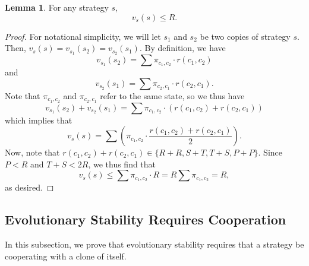 \documentclass[12pt]{article}
\theoremstyle{definition}
\newtheorem{lemma}[theorem]{Lemma}
\theoremstyle{remark}
\begin{document}
\begin{lemma}
  \label{neverbetterthanr}
  For any strategy $s$,
  \begin{equation*}
    v_{s}(s) \leq R.
  \end{equation*}
\end{lemma}
\begin{proof}
  For notational simplicity, we will let $s_1$ and $s_2$ be two copies of strategy $s$. Then, $v_{s}(s) = v_{s_1}(s_2) = v_{s_2}(s_1)$. By definition, we have
  \begin{equation*}
    v_{s_1}(s_2) = \sum \pi_{c_1,c_2} \cdot r(c_1, c_2)
  \end{equation*}
  and
  \begin{equation*}
    v_{s_2}(s_1) = \sum \pi_{c_2,c_1} \cdot r(c_2, c_1).
  \end{equation*}
  Note that $\pi_{c_1,c_2}$ and $\pi_{c_2,c_1}$ refer to the same state, so we thus have \begin{equation*}
    v_{s_1}(s_2) + v_{s_2}(s_1) = \sum \pi_{c_1,c_2} \cdot (r(c_1,c_2) + r(c_2,c_1))
  \end{equation*}
  which implies that \begin{equation*}
    v_s(s) = \sum \left( \pi_{c_1,c_2} \cdot \frac{r(c_1,c_2) + r(c_2,c_1)}{2} \right).
  \end{equation*}
  Now, note that $r(c_1,c_2) + r(c_2,c_1) \in \{R + R, S + T, T+S, P + P\}$. Since $P < R$ and $T + S < 2R$, we thus find that \begin{equation*}
    v_s(s) \leq \sum \pi_{c_1,c_2} \cdot R = R \sum \pi_{c_1,c_2} = R,
  \end{equation*}
  as desired.
\end{proof}

\subsection{Evolutionary Stability Requires Cooperation}

In this subsection, we prove that evolutionary stability requires that a strategy be cooperating with a clone of itself.
\end{document}
